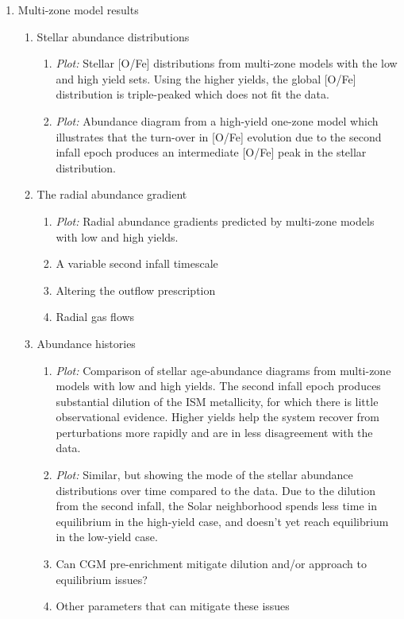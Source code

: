 \begin{enumerate}
    \item Multi-zone model results
    \begin{enumerate}
        \item Stellar abundance distributions
        \begin{enumerate}
            \item {\it Plot:} Stellar [O/Fe] distributions from multi-zone models with the low and high yield sets. Using the higher yields, the global [O/Fe] distribution is triple-peaked which does not fit the data.
            \item {\it Plot:} Abundance diagram from a high-yield one-zone model which illustrates that the turn-over in [O/Fe] evolution due to the second infall epoch produces an intermediate [O/Fe] peak in the stellar distribution.
        \end{enumerate}
        \item The radial abundance gradient
        \begin{enumerate}
            \item {\it Plot:} Radial abundance gradients predicted by multi-zone models with low and high yields.
            \item A variable second infall timescale
            \item Altering the outflow prescription
            \item Radial gas flows
        \end{enumerate}
        \item Abundance histories
        \begin{enumerate}
            \item {\it Plot:} Comparison of stellar age-abundance diagrams from multi-zone models with low and high yields. The second infall epoch produces substantial dilution of the ISM metallicity, for which there is little observational evidence. Higher yields help the system recover from perturbations more rapidly and are in less disagreement with the data.
            \item {\it Plot:} Similar, but showing the mode of the stellar abundance distributions over time compared to the data. Due to the dilution from the second infall, the Solar neighborhood spends less time in equilibrium in the high-yield case, and doesn't yet reach equilibrium in the low-yield case.
            \item Can CGM pre-enrichment mitigate dilution and/or approach to equilibrium issues?
            \item Other parameters that can mitigate these issues
        \end{enumerate}
    \end{enumerate}
    

\end{enumerate}
